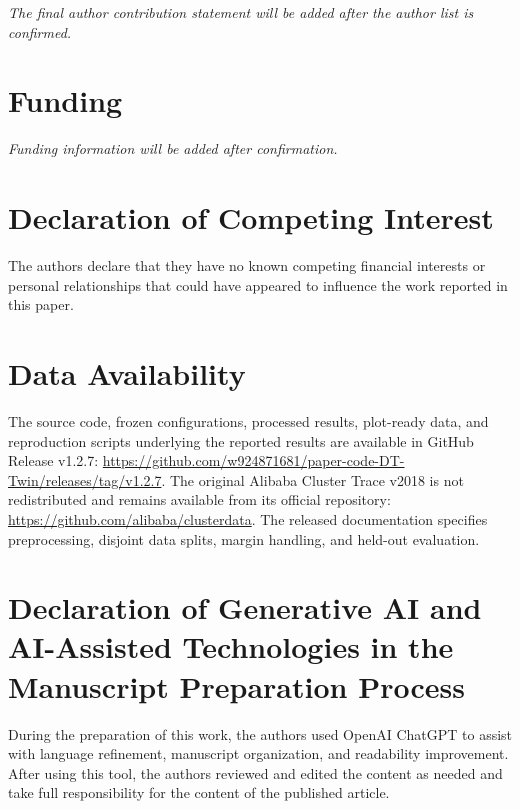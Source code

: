 \documentclass[a4paper,fleqn]{cas-sc}
\begin{document}
\textit{The final author contribution statement will be added after the
author list is confirmed.}

\section*{Funding}

\textit{Funding information will be added after confirmation.}

\section*{Declaration of Competing Interest}

The authors declare that they have no known competing financial
interests or personal relationships that could have appeared to
influence the work reported in this paper.

\section*{Data Availability}

The source code, frozen configurations, processed results, plot-ready data,
and reproduction scripts underlying the reported results are available in
GitHub Release v1.2.7:
\url{https://github.com/w924871681/paper-code-DT-Twin/releases/tag/v1.2.7}.
The original Alibaba Cluster Trace v2018 is not redistributed and remains
available from its official repository:
\url{https://github.com/alibaba/clusterdata}. The released documentation
specifies preprocessing, disjoint data splits, margin handling, and
held-out evaluation.

\section*{Declaration of Generative AI and AI-Assisted Technologies
in the Manuscript Preparation Process}

During the preparation of this work, the authors used OpenAI ChatGPT to
assist with language refinement, manuscript organization, and readability
improvement. After using this tool, the authors reviewed and edited the
content as needed and take full responsibility for the content of the
published article.
\end{document}
